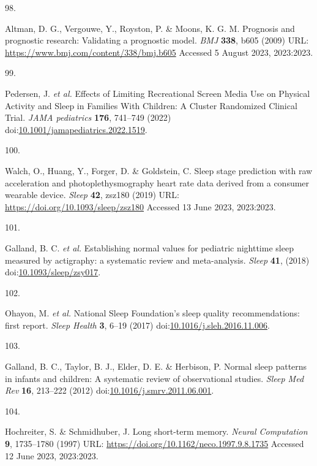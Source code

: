 \documentclass[
  9pt,
]{scrbook}
\newlength{\cslhangindent}
\newlength{\csllabelwidth}
\newlength{\cslentryspacingunit} %
\newenvironment{CSLReferences}[2] %
 {%
  \setlength{\parindent}{0pt}
  \ifodd #1
  \let\oldpar\par
  \def\par{\hangindent=\cslhangindent\oldpar}
  \fi
  \setlength{\parskip}{#2\cslentryspacingunit}
 }%
 {}
\newcommand{\CSLLeftMargin}[1]{\parbox[t]{\csllabelwidth}{#1}}
\newcommand{\CSLRightInline}[1]{\parbox[t]{\linewidth - \csllabelwidth}{#1}\break}
\begin{document}
\begin{CSLReferences}{0}{0}
\leavevmode{}%
\CSLLeftMargin{98. }%
\CSLRightInline{Altman, D. G., Vergouwe, Y., Royston, P. \& Moons, K. G.
M. Prognosis and prognostic research: Validating a prognostic model.
\emph{{BMJ}} \textbf{338}, b605 (2009) URL:
\url{https://www.bmj.com/content/338/bmj.b605} Accessed 5 August 2023,
2023:2023.}

\leavevmode{}%
\CSLLeftMargin{99. }%
\CSLRightInline{Pedersen, J. \emph{et al.} Effects of Limiting
Recreational Screen Media Use on Physical Activity and Sleep in Families
With Children: A Cluster Randomized Clinical Trial. \emph{JAMA
pediatrics} \textbf{176}, 741--749 (2022)
doi:\href{https://doi.org/10.1001/jamapediatrics.2022.1519}{10.1001/jamapediatrics.2022.1519}.}

\leavevmode{}%
\CSLLeftMargin{100. }%
\CSLRightInline{Walch, O., Huang, Y., Forger, D. \& Goldstein, C. Sleep
stage prediction with raw acceleration and photoplethysmography heart
rate data derived from a consumer wearable device. \emph{Sleep}
\textbf{42}, zsz180 (2019) URL:
\url{https://doi.org/10.1093/sleep/zsz180} Accessed 13 June 2023,
2023:2023.}

\leavevmode{}%
\CSLLeftMargin{101. }%
\CSLRightInline{Galland, B. C. \emph{et al.} Establishing normal values
for pediatric nighttime sleep measured by actigraphy: a systematic
review and meta-analysis. \emph{Sleep} \textbf{41}, (2018)
doi:\href{https://doi.org/10.1093/sleep/zsy017}{10.1093/sleep/zsy017}.}

\leavevmode{}%
\CSLLeftMargin{102. }%
\CSLRightInline{Ohayon, M. \emph{et al.} National Sleep Foundation's
sleep quality recommendations: first report. \emph{Sleep Health}
\textbf{3}, 6--19 (2017)
doi:\href{https://doi.org/10.1016/j.sleh.2016.11.006}{10.1016/j.sleh.2016.11.006}.}

\leavevmode{}%
\CSLLeftMargin{103. }%
\CSLRightInline{Galland, B. C., Taylor, B. J., Elder, D. E. \& Herbison,
P. Normal sleep patterns in infants and children: A systematic review of
observational studies. \emph{Sleep Med Rev} \textbf{16}, 213--222 (2012)
doi:\href{https://doi.org/10.1016/j.smrv.2011.06.001}{10.1016/j.smrv.2011.06.001}.}

\leavevmode{}%
\CSLLeftMargin{104. }%
\CSLRightInline{Hochreiter, S. \& Schmidhuber, J. Long short-term
memory. \emph{Neural Computation} \textbf{9}, 1735--1780 (1997) URL:
\url{https://doi.org/10.1162/neco.1997.9.8.1735} Accessed 12 June 2023,
2023:2023.}


\end{CSLReferences}
\end{document}
